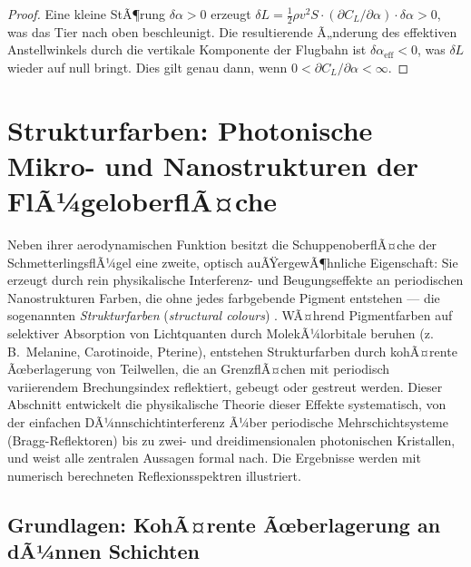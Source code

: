 ﻿\documentclass[a4paper,12pt]{article}
\theoremstyle{definition}
\begin{document}
	\begin{proof}
		Eine kleine StÃ¶rung $\delta\alpha > 0$ erzeugt $\delta L = \frac{1}{2}\rho v^2 S
		\cdot (\partial C_L/\partial \alpha) \cdot \delta\alpha > 0$, was das Tier nach
		oben beschleunigt.
		Die resultierende Ã„nderung des effektiven Anstellwinkels durch die vertikale
		Komponente der Flugbahn ist $\delta\alpha_\mathrm{eff} < 0$, was $\delta L$
		wieder auf null bringt.
		Dies gilt genau dann, wenn $0 < \partial C_L/\partial\alpha < \infty$.
	\end{proof}
	
\section{Strukturfarben: Photonische Mikro- und Nanostrukturen der FlÃ¼geloberflÃ¤che}
\label{sec:strukturfarben}

Neben ihrer aerodynamischen Funktion besitzt die SchuppenoberflÃ¤che der
SchmetterlingsflÃ¼gel eine zweite, optisch auÃŸergewÃ¶hnliche Eigenschaft:
Sie erzeugt durch rein physikalische Interferenz- und Beugungseffekte an
periodischen Nanostrukturen Farben, die ohne jedes farbgebende Pigment
entstehen --- die sogenannten \emph{Strukturfarben}
(\textit{structural colours}) \cite{vukusic2003photonic}.
WÃ¤hrend Pigmentfarben auf selektiver Absorption von Lichtquanten durch
MolekÃ¼lorbitale beruhen (z.\,B.\ Melanine, Carotinoide, Pterine), entstehen
Strukturfarben durch kohÃ¤rente Ãœberlagerung von Teilwellen, die an
GrenzflÃ¤chen mit periodisch variierendem Brechungsindex reflektiert,
gebeugt oder gestreut werden.
Dieser Abschnitt entwickelt die physikalische Theorie dieser Effekte
systematisch, von der einfachen DÃ¼nnschichtinterferenz Ã¼ber
periodische Mehrschichtsysteme (Bragg-Reflektoren) bis zu
zwei- und dreidimensionalen photonischen Kristallen, und weist alle
zentralen Aussagen formal nach.
Die Ergebnisse werden mit numerisch berechneten Reflexionsspektren
illustriert.

\subsection{Grundlagen: KohÃ¤rente Ãœberlagerung an dÃ¼nnen Schichten}
\label{sec:duennschicht}
\end{document}
